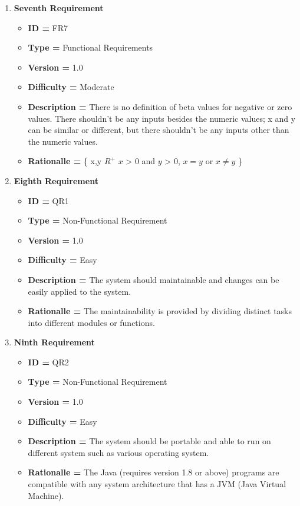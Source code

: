 \documentclass[a4paper, 12pt]{article}
\begin{document}
\begin{enumerate}[noitemsep]
        \item \textbf{Seventh Requirement}
        \begin{itemize}
            \item \textbf{ID = } FR7
            \item\textbf{Type = } Functional Requirements
            \item\textbf{Version = } 1.0
            \item\textbf{Difficulty = } Moderate
            \item\textbf{Description = } There is no definition of beta values for negative or zero values. There shouldn't be any inputs besides the numeric values; x and y can be similar or different, but there shouldn't be any inputs other than the numeric values.
            \item\textbf{Rationalle = } \{ \forall x,y \in $R^{+}$ \mid\; $x$ > $0$\; and \;$y$ > $0$, $ x = y $ or $ x \neq y $ \}
        \end{itemize}
        \newpage
        \item \textbf{Eighth Requirement}
        \begin{itemize}
            \item \textbf{ID = } QR1
            \item \textbf{Type = } Non-Functional Requirement
            \item \textbf{Version = } 1.0
            \item \textbf{Difficulty = } Easy
            \item \textbf{Description = } The system should maintainable and changes can be easily applied to the system.
            \item \textbf{Rationalle = } The maintainability is provided by dividing distinct tasks into different modules or functions.
        \end{itemize}
        
        \item \textbf{Ninth Requirement}
        \begin{itemize}
            \item \textbf{ID = } QR2
            \item \textbf{Type = } Non-Functional Requirement
            \item \textbf{Version = } 1.0
            \item \textbf{Difficulty = } Easy
            \item \textbf{Description = } The system should be portable and able to run on different system such as various operating system.
            \item \textbf{Rationalle = } The Java (requires version 1.8 or above) programs are compatible with any system architecture that has a JVM (Java Virtual Machine).
        \end{itemize}
        

\end{enumerate}
\end{document}
